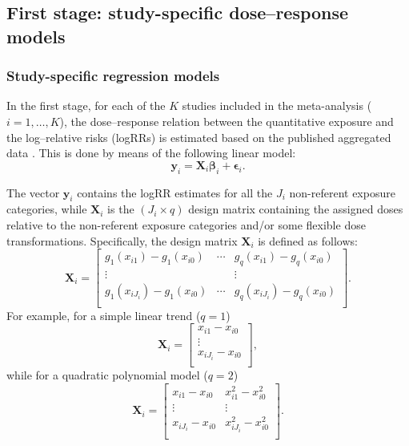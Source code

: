 \subsection{First stage: study-specific dose--response models}  

\subsubsection{Study-specific regression models}

In the first stage, for each of the $K$ studies included in the meta-analysis ($i=1,\ldots,K$), the dose--response relation between the quantitative exposure and the log--relative risks (logRRs) is estimated based on the published aggregated data \citep{greenland_methods_1992, berlin_metaanalysis_1993, orsini_generalized_2006}. This is done by means of the following linear model:
\begin{equation}
\mathbf{y}_i = \mathbf{X}_i \boldsymbol{\beta}_i + \boldsymbol{\epsilon}_i.
\label{eq:firststage}
\end{equation}

The vector $\mathbf{y}_i$ contains the logRR estimates for all the $J_i$ non-referent exposure categories, while $\mathbf{X}_i$ is the $(J_i \times q)$ design matrix containing the assigned doses relative to the non-referent exposure categories and/or some flexible dose transformations.  Specifically, the design matrix $\mathbf{X}_i$ is defined as follows:
\begin{equation*}
\mathbf{X}_i =
	\begin{bmatrix}
		g_1(x_{i1})-g_1(x_{i0}) & \cdots & g_q(x_{i1})-g_q(x_{i0}) \\
		\vdots & & \vdots \\
		g_1(x_{iJ_i})-g_1(x_{i0}) & \cdots & g_q(x_{iJ_i})-g_q(x_{i0}) \\
	\end{bmatrix}.
\end{equation*}
For example, for a simple linear trend ($q=1$)
\begin{equation*}
\mathbf{X}_i =
	\begin{bmatrix}
		x_{i1}-x_{i0}  \\
		\vdots  \\
		x_{iJ_i}-x_{i0} \\
	\end{bmatrix},
\end{equation*}
while for a quadratic polynomial model ($q=2$)
\begin{equation*}
\mathbf{X}_i =
	\begin{bmatrix}
		x_{i1}-x_{i0} &  x_{i1}^2-x_{i0}^2 \\
		\vdots &  \vdots \\ 
		x_{iJ_i}-x_{i0} &  x_{iJ_i}^2-x_{i0}^2 \\
	\end{bmatrix}.
\end{equation*}

